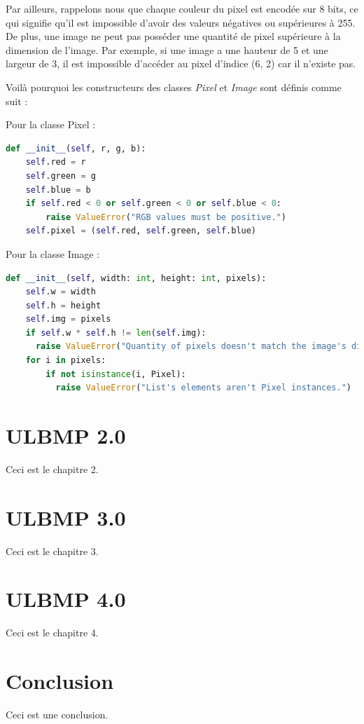 \documentclass[utf8]{article}
\begin{document}
Par ailleurs, rappelons nous que chaque couleur du pixel est encodée sur 8 bits, ce qui signifie qu'il est impossible d'avoir des valeurs négatives ou supérieures à 255. De plus, une image ne peut pas posséder une quantité de pixel supérieure à la dimension de l'image. Par exemple, si une image a une hauteur de 5 et une largeur de 3, il est impossible d'accéder au pixel d'indice (6, 2) car il n'existe pas.

Voilà pourquoi les constructeurs des classes \textit{Pixel} et \textit{Image} sont définis comme suit :

Pour la classe Pixel : 
\begin{lstlisting}[language=Python]
def __init__(self, r, g, b):
    self.red = r
    self.green = g
    self.blue = b
    if self.red < 0 or self.green < 0 or self.blue < 0:
        raise ValueError("RGB values must be positive.")
    self.pixel = (self.red, self.green, self.blue)
\end{lstlisting}

Pour la classe Image : 

\begin{lstlisting}[language=Python]
 def __init__(self, width: int, height: int, pixels):
    self.w = width
    self.h = height
    self.img = pixels
    if self.w * self.h != len(self.img):
      raise ValueError("Quantity of pixels doesn't match the image's dimension.")
    for i in pixels:
        if not isinstance(i, Pixel):
		  raise ValueError("List's elements aren't Pixel instances.")
\end{lstlisting}




\section{ULBMP 2.0}
Ceci est le chapitre 2.

\section{ULBMP 3.0}
Ceci est le chapitre 3.

\section{ULBMP 4.0}
Ceci est le chapitre 4.

\section{Conclusion}
Ceci est une conclusion.
\end{document}
